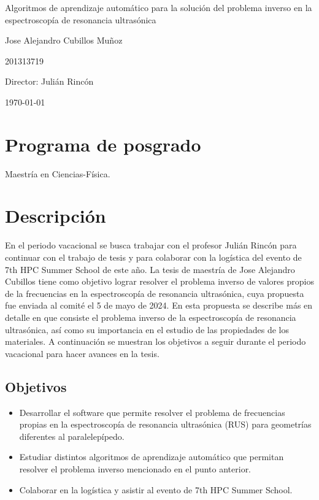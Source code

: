 \documentclass[12pt]{article}
\begin{document}
\begin{center}
\Huge
Algoritmos de aprendizaje automático para la solución del problema inverso en la espectroscopía de resonancia ultrasónica 

\vspace{3mm}
\Large Jose Alejandro Cubillos Muñoz

\large
201313719


\vspace{2mm}
\Large
Director: Julián Rincón

\normalsize
\vspace{2mm}

\today
\end{center}


\normalsize

\section{Programa de posgrado}
Maestría en Ciencias-Física.
\section{Descripción}

En el periodo vacacional se busca trabajar con el profesor Julián Rincón para continuar con el trabajo de tesis y para colaborar con la logística del evento de 7th HPC Summer School de este año.  La tesis de maestría de Jose Alejandro Cubillos tiene como objetivo lograr resolver el problema inverso de valores propios de la frecuencias en la espectroscopía de resonancia ultrasónica, cuya propuesta fue enviada al comité el 5 de mayo de 2024. En esta propuesta se describe más en detalle en que consiste el problema inverso de la espectroscopía de resonancia ultrasónica, así como su importancia en el estudio de las propiedades de los materiales. A continuación se muestran los objetivos a seguir durante el periodo vacacional para hacer avances en la tesis. 


\subsection{Objetivos}
\begin{itemize}
    \item Desarrollar el software que permite resolver el problema de frecuencias propias en la espectroscopía de resonancia ultrasónica (RUS) para geometrías diferentes al paralelepípedo.
    \item Estudiar distintos algoritmos de aprendizaje automático que permitan resolver el problema inverso mencionado en el punto anterior. 
    \item Colaborar en la logística y asistir al evento de 7th HPC Summer School. 
\end{itemize}
\end{document}
